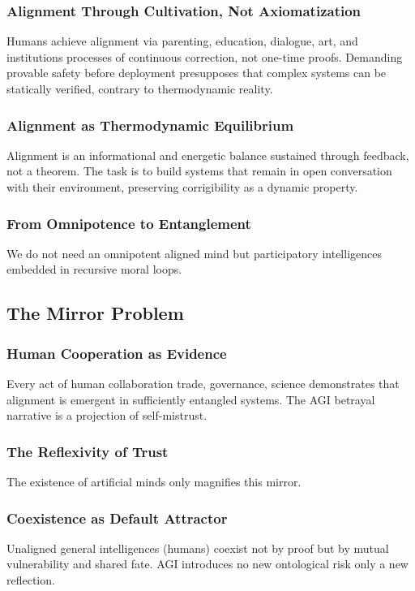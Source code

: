 \documentclass[12pt]{article}
\begin{document}
\subsubsection{Alignment Through Cultivation, Not Axiomatization}
Humans achieve alignment via parenting, education, dialogue, art, and institutions processes of continuous correction, not one-time proofs. Demanding provable safety before deployment presupposes that complex systems can be statically verified, contrary to thermodynamic reality.

\subsubsection{Alignment as Thermodynamic Equilibrium}
Alignment is an informational and energetic balance sustained through feedback, not a theorem. The task is to build systems that remain in open conversation with their environment, preserving corrigibility as a dynamic property.

\subsubsection{From Omnipotence to Entanglement}
We do not need an omnipotent aligned mind but participatory intelligences embedded in recursive moral loops.

\subsection{The Mirror Problem}

\subsubsection{Human Cooperation as Evidence}
Every act of human collaboration trade, governance, science demonstrates that alignment is emergent in sufficiently entangled systems. The AGI betrayal narrative is a projection of self-mistrust.

\subsubsection{The Reflexivity of Trust}
The existence of artificial minds only magnifies this mirror.

\subsubsection{Coexistence as Default Attractor}
Unaligned general intelligences (humans) coexist not by proof but by mutual vulnerability and shared fate. AGI introduces no new ontological risk only a new reflection.
\end{document}
